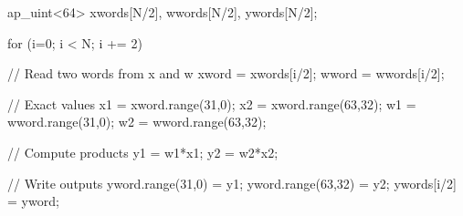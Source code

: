 \documentclass[11pt]{article}
\begin{document}
\begin{ccode}

ap_uint<64> xwords[N/2], wwords[N/2], ywords[N/2];

for (i=0; i < N; i += 2) {

  // Read two words from x and w
  xword = xwords[i/2];
  wword = wwords[i/2];

  // Exact values
  x1 = xword.range(31,0);
  x2 = xword.range(63,32);
  w1 = wword.range(31,0);
  w2 = wword.range(63,32);

  // Compute products
  y1 = w1*x1;
  y2 = w2*x2;

  // Write outputs
  yword.range(31,0) = y1;
  yword.range(63,32) = y2;
  ywords[i/2] = yword;
}
\end{ccode}
\end{document}
